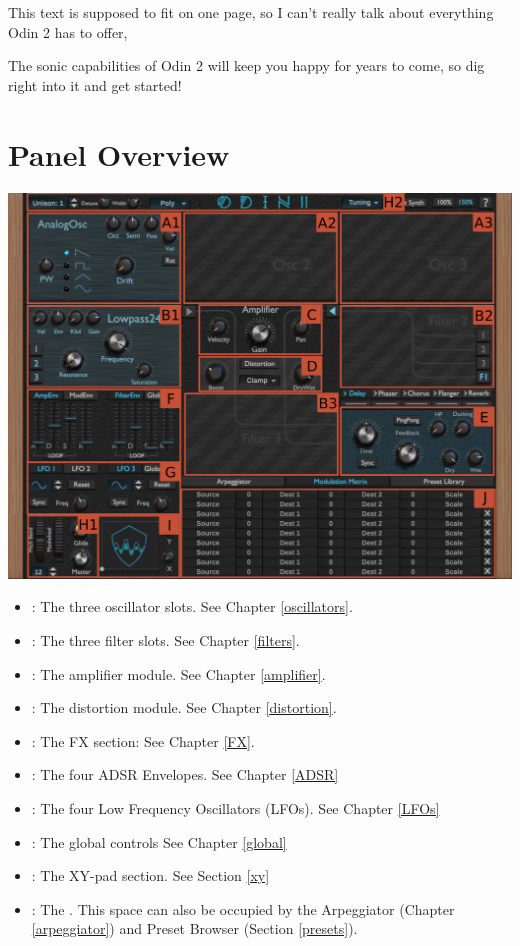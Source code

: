 \vspace{2mm}
This text is supposed to fit on one page, so I can't really talk about everything Odin 2 has to offer,

\begin{center}
\end{center}

The sonic capabilities of Odin 2 will keep you happy for years to come, so dig right into it and get started!

\clearpage
\section{Panel Overview}
\begin{center}
    \includegraphics[width=\textwidth]{graphics/overview.png}
\end{center}

\begin{itemize}
    \item {}: The three oscillator slots. See Chapter \ref{oscillators}.
    \item {}: The three filter slots. See Chapter \ref{filters}.
    \item {}: The amplifier module. See Chapter \ref{amplifier}.
    \item {}: The distortion module. See Chapter \ref{distortion}.
    \item {}: The FX section: See Chapter \ref{FX}.
    \item {}: The four ADSR Envelopes. See Chapter \ref{ADSR}
    \item {}: The four Low Frequency Oscillators (LFOs). See Chapter \ref{LFOs}
    \item {}: The global controls See Chapter \ref{global}
    \item {}: The XY-pad section. See Section \ref{xy}
    \item {}: The \modmatrix. This space can also be occupied by the Arpeggiator (Chapter \ref{arpeggiator}) and Preset Browser (Section \ref{presets}).
\end{itemize}
